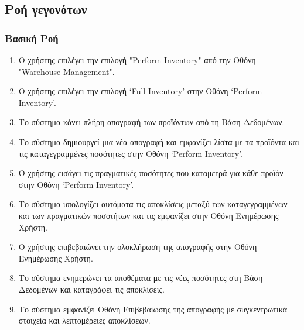 \documentclass[12pt,a4paper,twoside]{book}
\begin{document}
\subsection{Ροή γεγονότων}

\subsubsection{Βασική Ροή}
\begin{enumerate}
  \item Ο χρήστης επιλέγει την επιλογή "Perform Inventory" από την Οθόνη "Warehouse Management". %
  \item Ο χρήστης επιλέγει την επιλογή `Full Inventory' στην Οθόνη `Perform Inventory'. %
  \item Το σύστημα κάνει πλήρη απογραφή των προϊόντων από τη Βάση Δεδομένων. %
  \item Το σύστημα δημιουργεί μια νέα απογραφή και εμφανίζει λίστα με τα προϊόντα και τις καταγεγραμμένες ποσότητες στην Οθόνη `Perform Inventory'. %
  \item Ο χρήστης εισάγει τις πραγματικές ποσότητες που καταμετρά για κάθε προϊόν στην Οθόνη `Perform Inventory'.
  \item Το σύστημα υπολογίζει αυτόματα τις αποκλίσεις μεταξύ των καταγεγραμμένων και των πραγματικών ποσοτήτων και τις εμφανίζει στην Οθόνη Ενημέρωσης Χρήστη.
  \item Ο χρήστης επιβεβαιώνει την ολοκλήρωση της απογραφής στην Οθόνη Ενημέρωσης Χρήστη.
  \item Το σύστημα ενημερώνει τα αποθέματα με τις νέες ποσότητες στη Βάση Δεδομένων και καταγράφει τις αποκλίσεις. %
  \item Το σύστημα εμφανίζει Οθόνη Επιβεβαίωσης της απογραφής με συγκεντρωτικά στοιχεία και λεπτομέρειες αποκλίσεων.
\end{enumerate}
\end{document}
